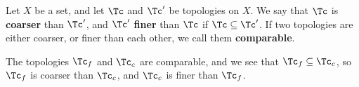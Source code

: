 \begin{definition}
    Let $X$ be a set, and let $\Tc$ and  $\Tc'$ be topologies on  $X$. We say that
    $\Tc$ is  \textbf{coarser} than $\Tc'$, and $\Tc'$ \textbf{finer} than $\Tc$ if
    $\Tc \subseteq \Tc'$.
    If two topologies are either coarser, or finer than each other, we call them
    \textbf{comparable}.
\end{definition}

\begin{example}
    The topologies $\Tc_f$ and  $\Tc_c$ are comparable, and we see that  $\Tc_f
    \subseteq \Tc_c$, so $\Tc_f$ is coarser than  $\Tc_c$, and  $\Tc_c$ is finer than
    $\Tc_f$.
\end{example}
